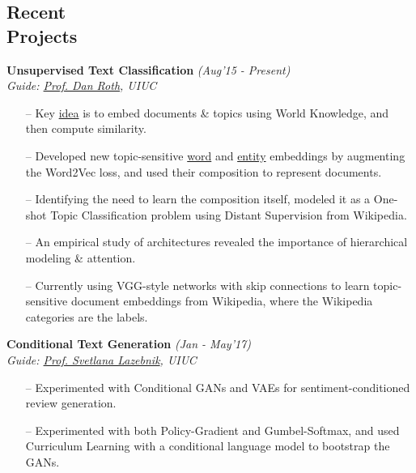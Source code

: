 \documentclass[margin,line]{templates/resume}
\newcommand{\myhref}[3][blue]{\href{#2}{\color{#1}{#3}}}
\newcommand{\compresslist}{%
\setlength{\itemsep}{3pt}%
\setlength{\parskip}{0pt}%
\setlength{\parsep}{0pt}%
}
\begin{document}
\begin{resume}
\section{\mysidestyle Recent\\ Projects}
\textsf{\textbf{Unsupervised Text Classification}} \hfill\textit{\small(Aug'15 - Present)}
\\ {\textit{Guide: \href{http://www.cis.upenn.edu/~danroth/}{Prof. Dan Roth}, UIUC}} \hfill{\myhref[darkblue]{https://shatu.github.io/\#dataless}{Web}}
\vspace{0.05cm}
\normalsize
\vspace{0.05cm}
\begin{itemize}[leftmargin=0.7cm]\compresslist
    \item[--] Key \href{https://cogcomp.org/page/project_view/6}{idea} is to embed documents \& topics using World Knowledge, and then compute similarity.
    \item[--] Developed new topic-sensitive \href{https://shatu.github.io/\#topic-emb}{word} and \href{https://shatu.github.io/\#entity-emb}{entity} embeddings by augmenting the Word2Vec loss, and used their composition to represent documents.
    \item[--] Identifying the need to learn the composition itself, modeled it as a One-shot Topic Classification problem using Distant Supervision from Wikipedia.
    \item[--] An empirical study of architectures revealed the importance of hierarchical modeling \& attention.
    \item[--] Currently using VGG-style networks with skip connections to learn topic-sensitive document embeddings from Wikipedia, where the Wikipedia categories are the labels.
\vspace{0.05cm}
    
\end{itemize}

\vspace{-0.1cm}    
\textsf{\textbf{Conditional Text Generation}} \hfill\textit{\small(Jan - May'17)}
\\ {\textit{Guide: \href{http://slazebni.cs.illinois.edu/}{Prof. Svetlana Lazebnik}, UIUC}} \hfill{\myhref[darkblue]{https://shatu.github.io/\#textGen}{Web}}
\vspace{0.05cm}
\begin{itemize}[leftmargin=*]\compresslist
\item[--]Experimented with Conditional GANs and VAEs for sentiment-conditioned review generation. \item[--]Experimented with both Policy-Gradient and Gumbel-Softmax, and used Curriculum Learning with a conditional language model to bootstrap the GANs.
\end{itemize}


\end{resume}
\end{document}
